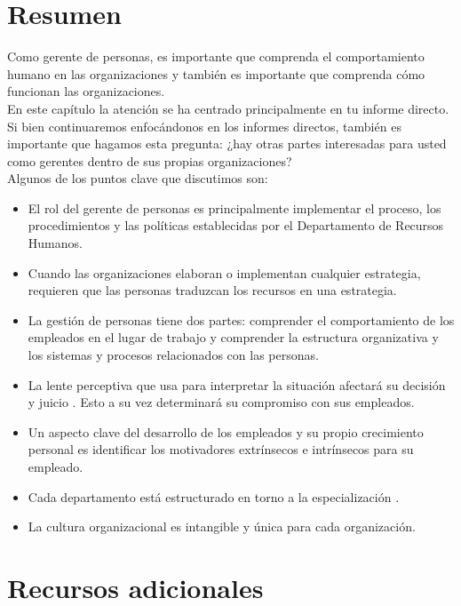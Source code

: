 \documentclass[10pt]{book}
\begin{document}
\section{Resumen}
Como gerente de personas, es importante que comprenda el comportamiento humano en las organizaciones y también es importante que comprenda cómo funcionan las organizaciones.\\
En este capítulo la atención se ha centrado principalmente en tu informe directo. Si bien continuaremos enfocándonos en los informes directos, también es importante que hagamos esta pregunta: ¿hay otras partes interesadas para usted como gerentes dentro de sus propias organizaciones?\\
Algunos de los puntos clave que discutimos son:
\begin{itemize}
\item El rol del gerente de personas es principalmente implementar el proceso, los procedimientos y las políticas establecidas por el Departamento de Recursos Humanos.
\item Cuando las organizaciones elaboran o implementan cualquier estrategia, requieren que las personas traduzcan los recursos en una estrategia.
\item La gestión de personas tiene dos partes: comprender el comportamiento de los empleados en el lugar de trabajo y comprender la estructura organizativa y los sistemas y procesos relacionados con las personas.
\item La lente perceptiva que usa para interpretar la situación afectará su decisión y juicio . Esto a su vez determinará su compromiso con sus empleados.
\item Un aspecto clave del desarrollo de los empleados y su propio crecimiento personal es identificar los motivadores extrínsecos e intrínsecos para su empleado.
\item Cada departamento está estructurado en torno a la especialización .
\item La cultura organizacional es intangible y única para cada organización.
\end{itemize}
\section{Recursos adicionales}
\end{document}
